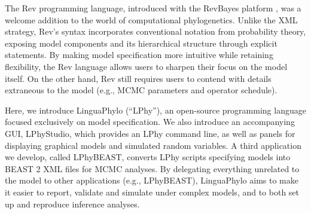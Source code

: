 \documentclass[10pt,letterpaper,table]{article}
\begin{document}
The Rev programming language, introduced with the RevBayes platform
\cite{revbayes}, was a welcome addition to the world of computational
phylogenetics. 
Unlike the XML strategy, Rev's syntax incorporates conventional
notation from probability theory, exposing model
components and its hierarchical structure through explicit statements.
By making model specification more intuitive while retaining
flexibility, the Rev language allows users to sharpen their focus on
the model itself.
On the other hand, Rev still requires users to contend with
details extraneous to the model (e.g., MCMC parameters and operator
schedule).

Here, we introduce LinguaPhylo (``LPhy''), an open-source programming
language focused exclusively on model specification.
We also introduce an accompanying GUI, LPhyStudio, which provides an
LPhy command line, as well as panels for displaying graphical models
and simulated random variables.
A third application we develop, called LPhyBEAST, converts LPhy scripts 
specifying models into BEAST 2 XML files for MCMC analyses.
By delegating everything unrelated to the model to other applications
(e.g., LPhyBEAST), LinguaPhylo aims to make it easier to report,
validate and simulate under complex models, and to both set up and
reproduce inference analyses.


\end{document}
